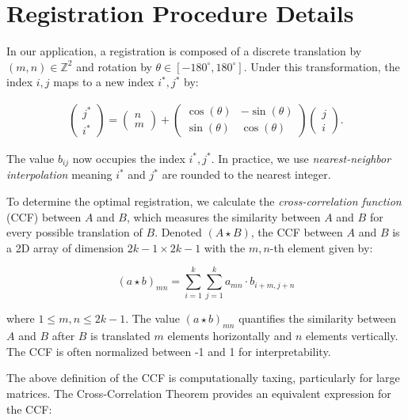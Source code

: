\documentclass[11pt,]{isuthesis}
\begin{document}
\hypertarget{registration-procedure-details}{%
\section{Registration Procedure Details}\label{registration-procedure-details}}

In our application, a registration is composed of a discrete translation by \((m,n) \in \mathbb{Z}^2\) and rotation by \(\theta \in [-180^\circ,180^\circ]\).
Under this transformation, the index \(i,j\) maps to a new index \(i^*,j^*\) by:

\begin{align*}
\begin{pmatrix} j^* \\ i^* \end{pmatrix} =
\begin{pmatrix} n \\ m \end{pmatrix} +
\begin{pmatrix} \cos(\theta) & -\sin(\theta) \\ \sin(\theta) & \cos(\theta) \end{pmatrix} \begin{pmatrix} j \\ i \end{pmatrix}.
\end{align*}

The value \(b_{ij}\) now occupies the index \(i^*, j^*\).
In practice, we use \emph{nearest-neighbor interpolation} meaning \(i^*\) and \(j^*\) are rounded to the nearest integer.

To determine the optimal registration, we calculate the \emph{cross-correlation function} (CCF) between \(A\) and \(B\), which measures the similarity between \(A\) and \(B\) for every possible translation of \(B\).
Denoted \((A \star B)\), the CCF between \(A\) and \(B\) is a 2D array of dimension \(2k - 1 \times 2k - 1\) with the \(m,n\)-th element given by:

\[
(a \star b)_{mn} = \sum_{i=1}^k \sum_{j=1}^k a_{mn} \cdot b_{i + m, j + n}
\]

where \(1 \leq m,n \leq 2k - 1\).
The value \((a \star b)_{mn}\) quantifies the similarity between \(A\) and \(B\) after \(B\) is translated \(m\) elements horizontally and \(n\) elements vertically.
The CCF is often normalized between -1 and 1 for interpretability.

The above definition of the CCF is computationally taxing, particularly for large matrices.
The Cross-Correlation Theorem provides an equivalent expression for the CCF:
\end{document}

